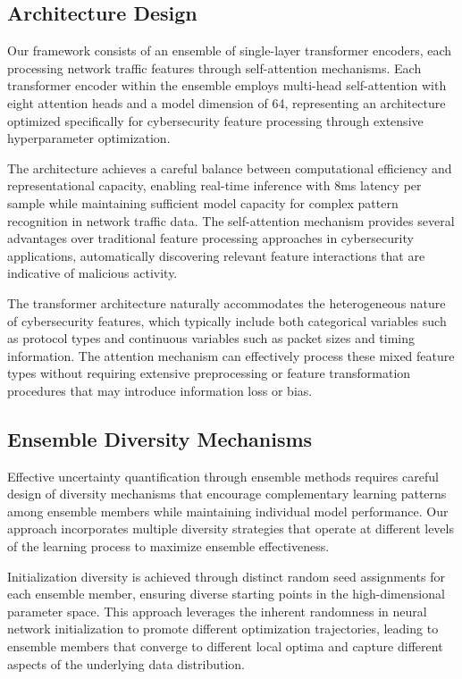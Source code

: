 \documentclass[journal]{IEEEtran}
\begin{document}
\subsection{Architecture Design}

Our framework consists of an ensemble of single-layer transformer encoders, each processing network traffic features through self-attention mechanisms. Each transformer encoder within the ensemble employs multi-head self-attention with eight attention heads and a model dimension of 64, representing an architecture optimized specifically for cybersecurity feature processing through extensive hyperparameter optimization.

The architecture achieves a careful balance between computational efficiency and representational capacity, enabling real-time inference with 8ms latency per sample while maintaining sufficient model capacity for complex pattern recognition in network traffic data. The self-attention mechanism provides several advantages over traditional feature processing approaches in cybersecurity applications, automatically discovering relevant feature interactions that are indicative of malicious activity.

The transformer architecture naturally accommodates the heterogeneous nature of cybersecurity features, which typically include both categorical variables such as protocol types and continuous variables such as packet sizes and timing information. The attention mechanism can effectively process these mixed feature types without requiring extensive preprocessing or feature transformation procedures that may introduce information loss or bias.

\subsection{Ensemble Diversity Mechanisms}

Effective uncertainty quantification through ensemble methods requires careful design of diversity mechanisms that encourage complementary learning patterns among ensemble members while maintaining individual model performance. Our approach incorporates multiple diversity strategies that operate at different levels of the learning process to maximize ensemble effectiveness.

Initialization diversity is achieved through distinct random seed assignments for each ensemble member, ensuring diverse starting points in the high-dimensional parameter space. This approach leverages the inherent randomness in neural network initialization to promote different optimization trajectories, leading to ensemble members that converge to different local optima and capture different aspects of the underlying data distribution.
\end{document}
